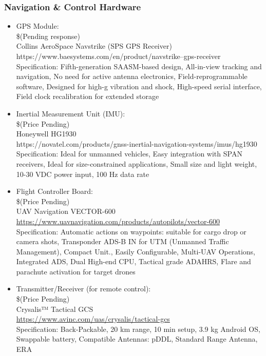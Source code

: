 \subsubsection{Navigation \& Control Hardware}
\begin{itemize}
    \item GPS Module: \\
    \$(Pending response)
    \\Collins AeroSpace Navstrike (SPS GPS Receiver) \\
https://www.baesystems.com/en/product/navstrike--gps-receiver \\ Specification: Fifth-generation SAASM-based design,
All-in-view tracking and navigation,
No need for active antenna electronics,
Field-reprogrammable software,
Designed for high-g vibration and shock,
High-speed serial interface,
Field clock recalibration for extended storage

    \item Inertial Measurement Unit (IMU): 
    \\ \$(Price Pending)
    \\Honeywell HG1930 \\https://novatel.com/products/gnss-inertial-navigation-systems/imus/hg1930 
    \\Specification: Ideal for unmanned vehicles,
Easy integration with SPAN receivers,
Ideal for size-constrained applications,
Small size and light weight,
10-30 VDC power input,
100 Hz data rate

    \item Flight Controller Board: \\ \$(Price Pending)
    \\UAV Navigation VECTOR-600 \\
\href{https://www.uavnavigation.com/products/autopilots/vector-600}{https://www.uavnavigation.com/products/autopilots/vector-600}
\\Specification: Automatic actions on waypoints: suitable for cargo drop or camera shots, Transponder ADS-B IN for UTM (Unmanned Traffic Management), Compact Unit., Easily Configurable, Multi-UAV Operations, Integrated ADS, Dual High-end CPU, Tactical grade ADAHRS, Flare and parachute activation for target drones

    \item Transmitter/Receiver (for remote control): \\ \$(Price Pending)
    \\ Crysalis™ Tactical GCS
    \\ \href{https://www.avinc.com/uas/crysalis/tactical-gcs}{https://www.avinc.com/uas/crysalis/tactical-gcs}
\\Specification: Back-Packable, 20 km range, 10 min setup, 3.9 kg Android OS, Swappable battery, Compatible Antennas: pDDL, Standard Range Antenna, ERA

\end{itemize}

